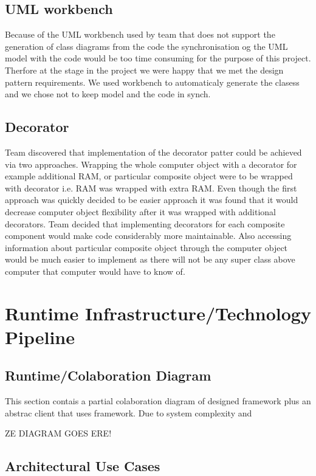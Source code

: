 \documentclass[pdftex,11pt,a4paper]{article}
\begin{document}
\subsection{UML workbench}
Because of the UML workbench used by team that does not support the generation of class diagrams from the code the synchronisation og the UML model with the code would be too time consuming for the purpose of this project. Therfore at the stage in the project we were happy that we met the design pattern requirements. We used workbench to automaticaly generate the clasess and we chose not to keep model and the code in synch.

\subsection{Decorator}

Team discovered that implementation of the decorator patter could be achieved via two approaches. Wrapping the whole computer object with a decorator for example additional RAM, or particular composite object were to be wrapped with decorator i.e. RAM was wrapped with extra RAM. Even though the first approach was quickly decided to be easier approach it was found that it would decrease computer object flexibility after it was wrapped with additional decorators. Team decided that implementing decorators for each composite component would make code considerably more maintainable. Also accessing information about particular composite object through the computer object would be much easier to implement as there will not be any super class above computer that computer would have to know of.

\pagebreak

\section{Runtime Infrastructure/Technology Pipeline}
\subsection{Runtime/Colaboration Diagram}
This section contais a partial colaboration diagram of designed framework plus an abstrac client that uses framework. Due to system complexity and 

ZE DIAGRAM GOES ERE! 

\subsection{Architectural Use Cases}
\end{document}
